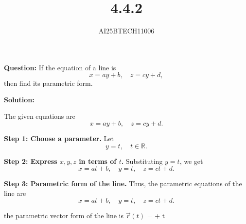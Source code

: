 \documentclass[journal]{IEEEtran}
\begin{document}

\vspace{3cm}

\title{4.4.2}
\author{AI25BTECH11006}
{\let\newpage\relax\maketitle}

\textbf{Question:}  
If the equation of a line is
\[
x = ay + b, \quad z = cy + d,
\]
 \hspace*{1.4em}then find its parametric form.


 \vspace{1em}

\textbf{Solution:}

The given equations are
\[
x = ay + b, \quad z = cy + d.
\]

\vspace{1em}

\textbf{Step 1: Choose a parameter.}  
Let
\[
y = t, \quad t \in \mathbb{R}.
\]

\vspace{1em}

\textbf{Step 2: Express $x, y, z$ in terms of $t$.}  
Substituting $y = t$, we get
\[
x = at + b, \quad y = t, \quad z = ct + d.
\]

\vspace{1em}
\textbf{Step 3: Parametric form of the line.}  
Thus, the parametric equations of the line are
\[
x = at + b, \quad y = t, \quad z = ct + d.
\]

the parametric vector form of the line is $\vec{r}(t)$ =  + t
\end{document}
